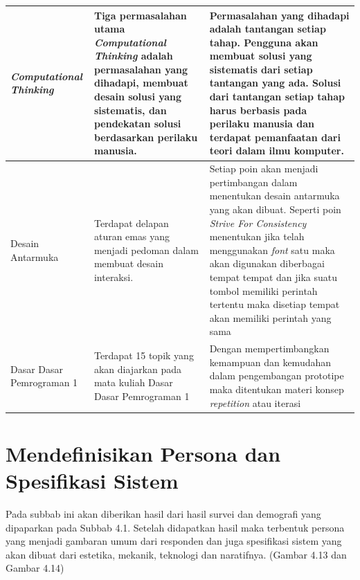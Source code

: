 \begin{longtable}{| p{2cm} | p{5cm} | p{5cm} |}
		\hline
		\textit{Computational Thinking} & Tiga permasalahan utama \textit{Computational Thinking} adalah permasalahan yang dihadapi, membuat desain solusi yang sistematis, dan pendekatan solusi berdasarkan perilaku manusia. & Permasalahan yang dihadapi adalah tantangan setiap tahap. Pengguna akan membuat solusi yang sistematis dari setiap tantangan yang ada. Solusi dari tantangan setiap tahap harus berbasis pada perilaku manusia dan terdapat pemanfaatan dari teori dalam ilmu komputer. \\ 
		\hline
		Desain Antarmuka & Terdapat delapan aturan emas yang menjadi pedoman dalam membuat desain interaksi. & Setiap poin akan menjadi pertimbangan dalam menentukan desain antarmuka yang akan dibuat. Seperti poin \textit{Strive For Consistency} menentukan jika telah menggunakan \textit{font} satu maka akan digunakan diberbagai tempat tempat dan jika suatu tombol memiliki perintah tertentu maka disetiap tempat akan memiliki perintah yang sama \\ 
		\hline
		Dasar Dasar Pemrograman 1 & Terdapat 15 topik yang akan diajarkan pada mata kuliah Dasar Dasar Pemrograman 1 & Dengan mempertimbangkan kemampuan dan kemudahan dalam pengembangan prototipe maka ditentukan materi konsep \textit{repetition} atau iterasi \\ \hline
\end{longtable}

\section{Mendefinisikan Persona dan Spesifikasi Sistem}
Pada subbab ini akan diberikan hasil dari hasil survei dan demografi yang dipaparkan pada Subbab 4.1. Setelah didapatkan hasil maka terbentuk persona yang menjadi gambaran umum dari responden dan juga spesifikasi sistem yang akan dibuat dari estetika, mekanik, teknologi dan naratifnya. (Gambar 4.13 dan Gambar 4.14)

